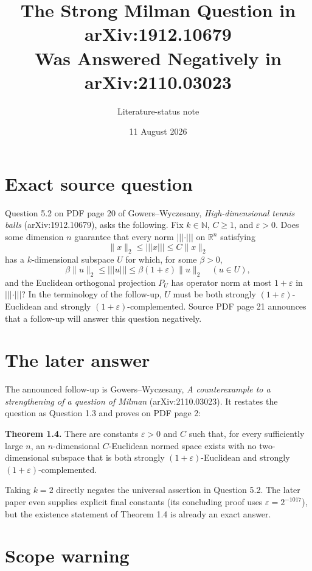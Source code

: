 \documentclass[11pt]{article}
\title{The Strong Milman Question in arXiv:1912.10679\\Was Answered Negatively in arXiv:2110.03023}
\author{Literature-status note}
\date{11 August 2026}
\newcommand{\vertiii}[1]{\lvert\!\lvert\!\lvert #1\rvert\!\rvert\!\rvert}
\begin{document}
\maketitle

\section*{Exact source question}

Question 5.2 on PDF page 20 of Gowers--Wyczesany,
\emph{High-dimensional tennis balls} (arXiv:1912.10679), asks the following.
Fix $k\in\mathbb N$, $C\geq1$, and $\varepsilon>0$.  Does some dimension
$n$ guarantee that every norm $\vertiii{\cdot}$ on $\mathbb R^n$ satisfying
\[
 \lVert x\rVert_2\leq\vertiii{x}\leq C\lVert x\rVert_2
\]
has a $k$-dimensional subspace $U$ for which, for some $\beta>0$,
\[
 \beta\lVert u\rVert_2\leq\vertiii{u}\leq
 \beta(1+\varepsilon)\lVert u\rVert_2 \quad(u\in U),
\]
and the Euclidean orthogonal projection $P_U$ has operator norm at most
$1+\varepsilon$ in $\vertiii{\cdot}$?  In the terminology of the follow-up,
$U$ must be both strongly $(1+\varepsilon)$-Euclidean and strongly
$(1+\varepsilon)$-complemented.  Source PDF page 21 announces that a follow-up
will answer this question negatively.

\section*{The later answer}

The announced follow-up is Gowers--Wyczesany,
\emph{A counterexample to a strengthening of a question of Milman}
(arXiv:2110.03023).  It restates the question as Question 1.3 and proves on
PDF page 2:

\medskip
\noindent\textbf{Theorem 1.4.}
There are constants $\varepsilon>0$ and $C$ such that, for every sufficiently
large $n$, an $n$-dimensional $C$-Euclidean normed space exists with no
two-dimensional subspace that is both strongly
$(1+\varepsilon)$-Euclidean and strongly
$(1+\varepsilon)$-complemented.
\medskip

Taking $k=2$ directly negates the universal assertion in Question 5.2.
The later paper even supplies explicit final constants (its concluding proof
uses $\varepsilon=2^{-1017}$), but the existence statement of Theorem 1.4 is
already an exact answer.

\section*{Scope warning}
\end{document}
